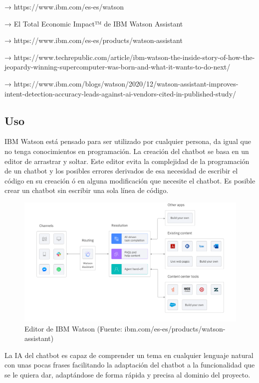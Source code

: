 → https://www.ibm.com/es-es/watson

→ El Total Economic Impact™ de IBM Watson Assistant

→ https://www.ibm.com/es-es/products/watson-assistant

→ https://www.techrepublic.com/article/ibm-watson-the-inside-story-of-how-the-jeopardy-winning-supercomputer-was-born-and-what-it-wants-to-do-next/

→ https://www.ibm.com/blogs/watson/2020/12/watson-assistant-improves-intent-detection-accuracy-leads-against-ai-vendors-cited-in-published-study/

\subsection*{Uso}

IBM Watson está pensado para ser utilizado por cualquier persona, da igual que no tenga conocimientos en programación. La creación del chatbot se basa en un editor de arrastrar y soltar. Este editor evita la complejidad de la programación de un chatbot y los posibles errores derivados de esa necesidad de escribir el código en su creación ó en alguna modificación que necesite el chatbot. Es posible crear un chatbot sin escribir una sola línea de código.

\begin{figure}[h]
    \centering
    \includegraphics[width=1.0\textwidth]{imagenes/plataformas/editor_IBM_Watson.png}
    \caption{Editor de IBM Watson (Fuente: ibm.com/es-es/products/watson-assistant)}
\end{figure}

La IA del chatbot es capaz de comprender un tema en cualquier lenguaje natural con unas pocas frases facilitando la adaptación del chatbot a la funcionalidad que se le quiera dar, adaptándose de forma rápida y precisa al dominio del proyecto.

